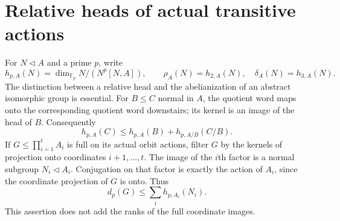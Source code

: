 \section{Relative heads of actual transitive actions}\label{sec:relative-ranks}
For $N\lhd A$ and a prime $p$, write
\[
 h_{p,A}(N)=\dim_{\mathbb F_p}N/(N^p[N,A]),\qquad
 \rho_A(N)=h_{2,A}(N),\quad \delta_A(N)=h_{3,A}(N).
\]
The distinction between a relative head and the abelianization of an
abstract isomorphic group is essential. For $B\leq C$ normal in $A$,
the quotient word maps onto the corresponding quotient word downstairs;
its kernel is an image of the head of $B$. Consequently
\begin{equation}\label{eq:relative-head-chain}
 h_{p,A}(C)\leq h_{p,A}(B)+h_{p,A/B}(C/B).
\end{equation}
If $G\leq\prod_{i=1}^t A_i$ is full on its actual orbit actions, filter
$G$ by the kernels of projection onto coordinates $i+1,\ldots,t$.
The image of the $i$th factor is a normal subgroup $N_i\lhd A_i$.
Conjugation on that factor is exactly the action of $A_i$, since the
coordinate projection of $G$ is onto. Thus
\begin{equation}\label{eq:orbit-relative-head}
 d_p(G)\leq\sum_i h_{p,A_i}(N_i).
\end{equation}
This assertion does not add the ranks of the full coordinate images.

